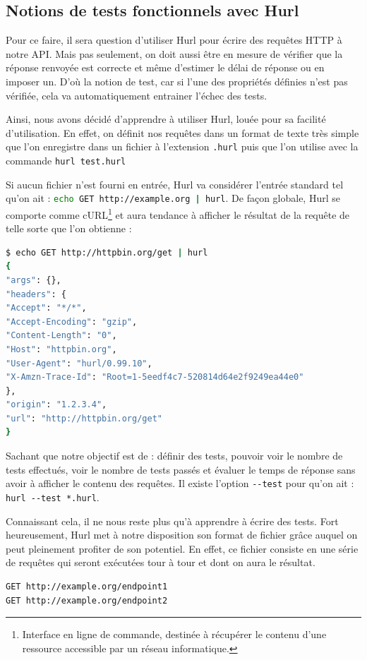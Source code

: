 \subsection{Notions de tests fonctionnels avec Hurl}
Pour ce faire, il sera question d'utiliser Hurl pour \'ecrire des requ\^etes HTTP \`a notre API. Mais pas seulement, on doit aussi \^etre en mesure de v\'erifier que la r\'eponse renvoy\'ee est correcte et m\^eme d'estimer le d\'elai de r\'eponse ou en imposer un. 
D'o\`u la notion de test, car si l'une des propri\'et\'es d\'efinies n'est pas v\'erifi\'ee, cela va automatiquement entrainer l'\'echec des tests.

Ainsi, nous avons d\'ecid\'e d'apprendre \`a utiliser Hurl, lou\'ee pour sa facilit\'e d'utilisation. En effet, on d\'efinit nos requ\^etes dans un format de texte tr\`es simple que l'on enregistre dans un fichier \`a l'extension \lstinline{.hurl} 
puis que l'on utilise avec la commande \lstinline!hurl test.hurl!

Si aucun fichier n'est fourni en entr\'ee, Hurl va consid\'erer l'entr\'ee standard tel qu'on ait : \lstinline[language=bash]{echo GET http://example.org | hurl}. De fa\c{c}on globale, Hurl se comporte comme cURL\footnote{Interface en ligne de commande, 
destin\'ee \`a r\'ecup\'erer le contenu d'une ressource accessible par un r\'eseau informatique.} et aura tendance \`a afficher le r\'esultat de la requ\^ete de telle sorte que l'on obtienne :
\begin{lstlisting}[language=bash, frame=single, title={Comportement cURL}, breaklines]
$ echo GET http://httpbin.org/get | hurl
{
"args": {},
"headers": {
"Accept": "*/*",
"Accept-Encoding": "gzip",
"Content-Length": "0",
"Host": "httpbin.org",
"User-Agent": "hurl/0.99.10",
"X-Amzn-Trace-Id": "Root=1-5eedf4c7-520814d64e2f9249ea44e0"
},
"origin": "1.2.3.4",
"url": "http://httpbin.org/get"
}
\end{lstlisting}

Sachant que notre objectif est de : d\'efinir des tests, pouvoir voir le nombre de tests effectu\'es, voir le nombre de tests pass\'es et \'evaluer le temps de r\'eponse sans avoir \`a afficher le contenu des requ\^etes. Il existe l'option \lstinline{--test} pour qu'on ait :
\lstinline{hurl --test *.hurl}.

Connaissant cela, il ne nous reste plus qu'\`a apprendre \`a \'ecrire des tests. Fort heureusement, Hurl met \`a notre disposition son format de fichier gr\^ace auquel on peut pleinement profiter de son potentiel. En effet, ce fichier consiste en une s\'erie de requ\^etes 
qui seront ex\'ecut\'ees tour \`a tour et dont on aura le r\'esultat.\\
\begin{lstlisting}[language=bash, frame=single, title={*.hurl}]
GET http://example.org/endpoint1
GET http://example.org/endpoint2
\end{lstlisting}

